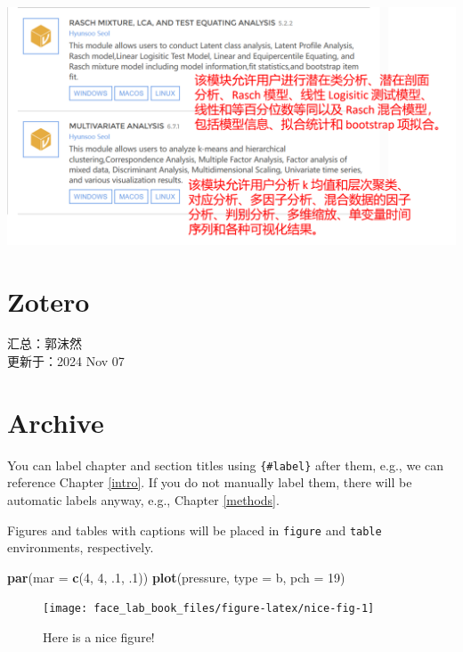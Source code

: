 \documentclass[
]{book}
\newenvironment{Shaded}{\begin{snugshade}}{\end{snugshade}}
\newcommand{\AttributeTok}[1]{\textcolor[rgb]{0.13,0.29,0.53}{#1}}
\newcommand{\DecValTok}[1]{\textcolor[rgb]{0.00,0.00,0.81}{#1}}
\newcommand{\FunctionTok}[1]{\textcolor[rgb]{0.13,0.29,0.53}{\textbf{#1}}}
\newcommand{\NormalTok}[1]{#1}
\newcommand{\StringTok}[1]{\textcolor[rgb]{0.31,0.60,0.02}{#1}}
\begin{document}
\includegraphics{img/jamovi/modules4.png}

\chapter{Zotero}\label{zotero}

汇总：郭沫然\\
更新于：2024 Nov 07

\chapter*{Archive}\label{archive}

You can label chapter and section titles using \texttt{\{\#label\}} after them, e.g., we can reference Chapter \ref{intro}. If you do not manually label them, there will be automatic labels anyway, e.g., Chapter \ref{methods}.

Figures and tables with captions will be placed in \texttt{figure} and \texttt{table} environments, respectively.

\begin{Shaded}
\begin{Highlighting}[]
\FunctionTok{par}\NormalTok{(}\AttributeTok{mar =} \FunctionTok{c}\NormalTok{(}\DecValTok{4}\NormalTok{, }\DecValTok{4}\NormalTok{, .}\DecValTok{1}\NormalTok{, .}\DecValTok{1}\NormalTok{))}
\FunctionTok{plot}\NormalTok{(pressure, }\AttributeTok{type =} \StringTok{\textquotesingle{}b\textquotesingle{}}\NormalTok{, }\AttributeTok{pch =} \DecValTok{19}\NormalTok{)}
\end{Highlighting}
\end{Shaded}

\begin{figure}

{\centering \texttt{[image: face\_lab\_book\_files/figure-latex/nice-fig-1]} 

}

\caption{Here is a nice figure!}\label{fig:nice-fig}
\end{figure}
\end{document}
